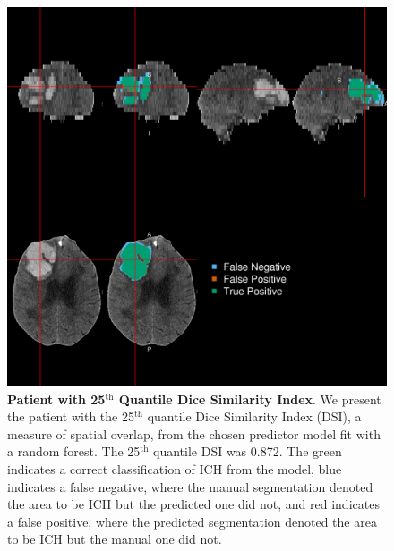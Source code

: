 \documentclass{elsarticle_nonatbib}\usepackage[]{graphicx}\usepackage[]{color}
\begin{document}
 \begin{figure}
\centering
\includegraphics[width=0.75\linewidth,keepaspectratio]{Reseg_Figure_DSI_Quantile_025_native.png}
\caption{{\bf Patient with  25$^{\text{th}}$ Quantile Dice Similarity Index}. We present the patient with the 25$^{\text{th}}$ quantile Dice Similarity Index (DSI), a measure of spatial overlap, from the chosen predictor model fit with a random forest.  The 25$^{\text{th}}$ quantile DSI was 0.872. The green indicates a correct classification of ICH from the model, blue indicates a false negative, where the manual segmentation denoted the area to be ICH but the predicted one did not, and red indicates a false positive, where the predicted segmentation denoted the area to be ICH but the manual one did not. }
\label{fig:dice_img25}
\end{figure}
\end{document}
